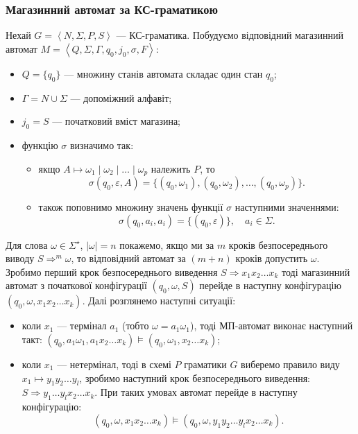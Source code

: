 \subsubsection{Магазинний автомат за КС-граматикою}

Нехай $G = \left\langle N, \Sigma, P, S \right\rangle$ --- КС-граматика. Побудуємо відповідний магазинний автомат $M = \left\langle Q, \Sigma, \Gamma, q_0, j_0, \sigma, F \right\rangle$:
\begin{itemize}
	\item $Q = \{q_0\}$ --- множину станів автомата складає один стан $q_0$;
	\item $\Gamma = N \cup \Sigma$ --- допоміжний алфавіт;
	\item $j_0 = S$ --- початковий вміст магазина;
	\item функцію $\sigma$ визначимо так:
	\begin{itemize}
		\item якщо $A \mapsto \omega_1 \mid \omega_2 \mid \ldots \mid \omega_p$ належить $P$, то
		\[ \sigma(q_0, \varepsilon, A)=\{(q_0, \omega_1), (q_0, \omega_2), \ldots, (q_0, \omega_p)\}.\]
		\item також поповнимо множину значень функції $\sigma$ наступними значеннями:
		\[ \sigma(q_0, a_i, a_i) = \{(q_0, \varepsilon)\}, \quad a_i \in \Sigma.\]
	\end{itemize}
\end{itemize}

Для слова $\omega \in \Sigma^\star$, $|\omega| = n$ покажемо, якщо ми за $m$ кроків 
безпосереднього виводу $S \Rightarrow^m \omega$, то відповідний автомат за $(m + n)$ кроків допустить $\omega$. Зробимо перший крок безпосереднього виведення $S \Rightarrow x_1 x_2 \ldots x_k$ тоді магазинний автомат з початкової конфігурації $(q_0, \omega, S)$ перейде в наступну конфігурацію $(q_0, \omega, x_1 x_2 \ldots x_k)$. Далі розглянемо наступні ситуації:
\begin{itemize}
	\item коли $x_1$ --- термінал $a_1$ (тобто $\omega = a_1 \omega_1$), тоді МП-автомат виконає наступний такт: $(q_0, a_1 \omega_1, a_1 x_2 \ldots x_k) \models (q_0, \omega_1, x_2 \ldots x_k)$;
	\item коли $x_1$ --- нетермінал, тоді в схемі $P$ граматики $G$ виберемо правило виду $x_1 \mapsto y_1 y_2 \ldots y_l$, зробимо наступний крок безпосереднього виведення: $S \Rightarrow y_1 \ldots y_l x_2 \ldots x_k$. При таких умовах автомат перейде в наступну конфігурацію:
	\[ (q_0, \omega, x_1 x_2 \ldots x_k) \models (q_0, \omega, y_1 y_2 \ldots y_l x_2 \ldots x_k).\]
\end{itemize}

